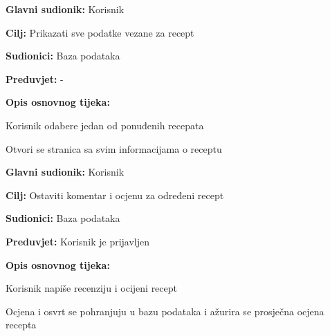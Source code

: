 \noindent {}
\begin{packed_item}

	\item \textbf{Glavni sudionik: } Korisnik
	\item  \textbf{Cilj:} Prikazati sve podatke vezane za recept
	\item  \textbf{Sudionici:} Baza podataka
	\item  \textbf{Preduvjet:} -
	\item  \textbf{Opis osnovnog tijeka:}

	\item[] \begin{packed_enum}

		\item Korisnik odabere jedan od ponuđenih recepata
		\item Otvori se stranica sa svim informacijama o receptu \newline \newline \newline
	\end{packed_enum}
\end{packed_item}

\noindent {}
\begin{packed_item}

	\item \textbf{Glavni sudionik: } Korisnik
	\item  \textbf{Cilj:} Ostaviti komentar i ocjenu za određeni recept
	\item  \textbf{Sudionici:} Baza podataka
	\item  \textbf{Preduvjet:} Korisnik je prijavljen
	\item  \textbf{Opis osnovnog tijeka:}

	\item[] \begin{packed_enum}

		\item Korisnik napiše recenziju i ocijeni recept
		\item Ocjena i osvrt se pohranjuju u bazu podataka i ažurira se prosječna ocjena recepta
	\end{packed_enum}
\end{packed_item}

